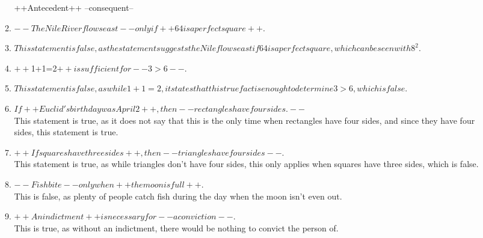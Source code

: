 \documentclass{letter}
\begin{document}
\begin{description}
\begin{enumerate}
\begin{enumerate}
                         ++Antecedent++  --consequent-- \\
			\item  $--The Nile River flows east-- only if ++64 is a perfect square++.$ \\ 
                        \item  $This statement is false, as the statement suggests the Nile flows east if 64 is a perfect square, which can be seen with 8^2.$ \\ 
			\item  $++$1+1=2$++ is sufficient for -- 3>6 --.$ \\ 
                        \item  $This statement is false, as while 1+1=2, it states that this true fact is enough to determine 3>6, which is false.$ \\
			\item  $If ++Euclid's birthday was April 2++, then --rectangles have four sides.--$ \\
                          This statement is true, as it does not say that this is the only time when rectangles have four sides, and since they have four sides, this statement is true.
			\item  $++If squares have three sides++, then --triangles have four sides--. $\\
                          This statement is true, as while triangles don't have four sides, this only applies when squares have three sides, which is false.
			\item $--Fish bite-- only when ++the moon is full++.$ \\
                          This is false, as plenty of people catch fish during the day when the moon isn't even out.
			\item $++An indictment++ is necessary for --a conviction--.$ \\
                          This is true, as without an indictment, there would be nothing to convict the person of.
	                  

\end{enumerate}
\end{enumerate}
\end{description}
\end{document}
